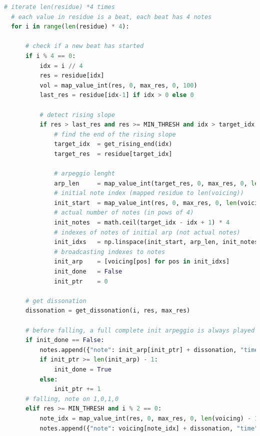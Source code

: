 \begin{lstlisting}[language=Python,caption={Implementazione dell'algoritmo di residuo.},label={lst:residue}]
  # iterate len(residue) *4 times
  # each value in residue is a beat, each beat has 4 notes
  for i in range(len(residue) * 4):

      # check if a new beat has started
      if i % 4 == 0:
          idx = i // 4
          res = residue[idx]
          vol = map_value_int(res, 0, max_res, 0, 100)
          last_res = residue[idx-1] if idx > 0 else 0

          # detect rising slope
          if res > last_res and res >= MIN_THRESH and idx > target_idx:
              # find the end of the rising slope
              target_idx  = get_rising_end(idx)
              target_res  = residue[target_idx]

              # arpeggio lenght
              arp_len     = map_value_int(target_res, 0, max_res, 0, len(voicing)-1)
              # initial note index (mapped residue to len(voicing))  
              init_start  = map_value_int(res, 0, max_res, 0, len(voicing) - 1)       
              # actual number of notes (in pows of 4)
              init_notes  = math.ceil(target_idx - idx + 1) * 4                       
              # indexes of notes of initial arp (not actual notes)
              init_idxs   = np.linspace(init_start, arp_len, init_notes, dtype=int)   
              # broadcasting indexes to notes
              init_arp    = [voicing[pos] for pos in init_idxs]                       
              init_done   = False
              init_ptr    = 0

      # get dissonation
      dissonation = get_dissonation(i, res, max_res)

      # before falling, a full complete init arpeggio is always played
      if init_done == False:
          notes.append({"note": init_arp[init_ptr] + dissonation, "time": duration * i, "duration": duration, "volume": vol })
          if init_ptr >= len(init_arp) - 1:
              init_done = True
          else:
              init_ptr += 1
      # falling, note on 1,0,1,0
      elif res >= MIN_THRESH and i % 2 == 0:
          note_idx = map_value_int(res, 0, max_res, 0, len(voicing) - 1)
          notes.append({"note": voicing[note_idx] + dissonation, "time": duration * i, "duration": duration, "volume": vol })

\end{lstlisting}


